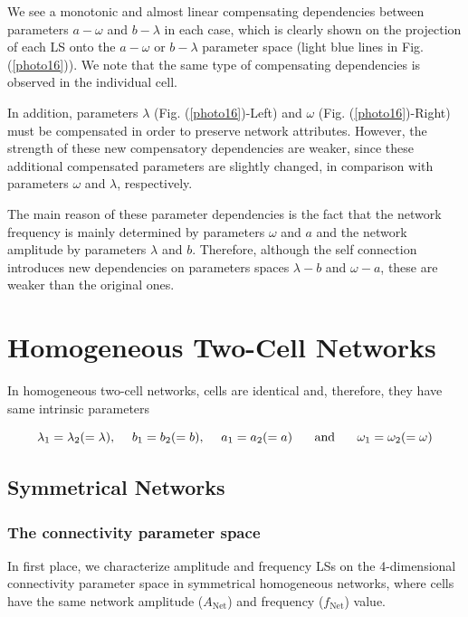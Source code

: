 We see a monotonic and almost linear compensating dependencies between parameters $a-\omega$ and $b-\lambda$ in each case, which is clearly shown on the projection of each LS onto the $a-\omega$ or $b-\lambda$ parameter space (light blue lines in Fig. (\ref{photo16})). We note that the same type of compensating dependencies is observed in the individual cell.

In addition, parameters $\lambda$ (Fig. (\ref{photo16})-Left) and $\omega$ (Fig. (\ref{photo16})-Right) must be compensated in order to preserve network attributes. However, the strength of these new compensatory dependencies are weaker, since these additional compensated parameters are slightly changed, in comparison with parameters $\omega$ and $\lambda$, respectively.

The main reason of these parameter dependencies is the fact that the network frequency is mainly determined by parameters $\omega$ and $a$ and the network amplitude by parameters $\lambda$ and $b$. Therefore, although the self connection introduces new dependencies on parameters spaces $\lambda-b$ and $\omega-a$, these are weaker than the original ones.

\section{Homogeneous Two-Cell Networks}
In homogeneous two-cell networks, cells are identical and, therefore, they have same intrinsic parameters

\begin{equation}
   \lambda_{1}=\lambda_{2}(=\lambda) \text{,} \hspace{0.5cm} b_{1} = b_{2}(=b) \text{,} \hspace{0.5cm} a_{1}=a_{2}(=a) \hspace{0.5cm} \text{ and } \hspace{0.5cm} \omega_{1} = \omega_{2}(=\omega)
\end{equation}

\subsection{Symmetrical Networks}
\subsubsection{The connectivity parameter space}
In first place, we characterize amplitude and frequency LSs on the 4-dimensional connectivity parameter space in symmetrical homogeneous networks, where cells have the same network amplitude ($A_{\text{Net}}$) and frequency ($f_{\text{Net}}$) value.

